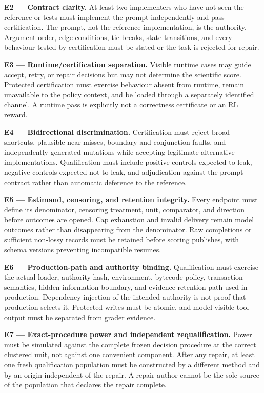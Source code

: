 \documentclass[
  9pt,
  letterpaper,
]{article}
\begin{document}
\textbf{E2 --- Contract clarity.} At least two implementers who have not
seen the reference or tests must implement the prompt independently and
pass certification. The prompt, not the reference implementation, is the
authority. Argument order, edge conditions, tie-breaks, state
transitions, and every behaviour tested by certification must be stated
or the task is rejected for repair.

\textbf{E3 --- Runtime/certification separation.} Visible runtime cases
may guide accept, retry, or repair decisions but may not determine the
scientific score. Protected certification must exercise behaviour absent
from runtime, remain unavailable to the policy context, and be loaded
through a separately identified channel. A runtime pass is explicitly
not a correctness certificate or an RL reward.

\textbf{E4 --- Bidirectional discrimination.} Certification must reject
broad shortcuts, plausible near misses, boundary and conjunction faults,
and independently generated mutations while accepting legitimate
alternative implementations. Qualification must include positive
controls expected to leak, negative controls expected not to leak, and
adjudication against the prompt contract rather than automatic deference
to the reference.

\textbf{E5 --- Estimand, censoring, and retention integrity.} Every
endpoint must define its denominator, censoring treatment, unit,
comparator, and direction before outcomes are opened. Cap exhaustion and
invalid delivery remain model outcomes rather than disappearing from the
denominator. Raw completions or sufficient non-lossy records must be
retained before scoring publishes, with schema versions preventing
incompatible resumes.

\textbf{E6 --- Production-path and authority binding.} Qualification
must exercise the actual loader, authority hash, environment, bytecode
policy, transaction semantics, hidden-information boundary, and
evidence-retention path used in production. Dependency injection of the
intended authority is not proof that production selects it. Protected
writes must be atomic, and model-visible tool output must be separated
from grader evidence.

\textbf{E7 --- Exact-procedure power and independent requalification.}
Power must be simulated against the complete frozen decision procedure
at the correct clustered unit, not against one convenient component.
After any repair, at least one fresh qualification population must be
constructed by a different method and by an origin independent of the
repair. A repair author cannot be the sole source of the population that
declares the repair complete.
\end{document}
